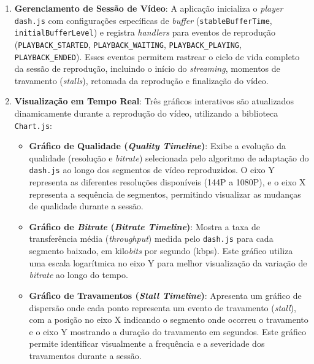 \begin{enumerate}
    \item \textbf{Gerenciamento de Sessão de Vídeo}: A aplicação inicializa o \textit{player} \texttt{dash.js} com configurações específicas de \textit{buffer} (\texttt{stableBufferTime}, \texttt{initialBufferLevel}) e registra \textit{handlers} para eventos de reprodução (\texttt{PLAYBACK\_STARTED}, \texttt{PLAYBACK\_WAITING}, \texttt{PLAYBACK\_PLAYING}, \texttt{PLAYBACK\_ENDED}). Esses eventos permitem rastrear o ciclo de vida completo da sessão de reprodução, incluindo o início do \textit{streaming}, momentos de travamento (\textit{stalls}), retomada da reprodução e finalização do vídeo.
    
    \item \textbf{Visualização em Tempo Real}: Três gráficos interativos são atualizados dinamicamente durante a reprodução do vídeo, utilizando a biblioteca \texttt{Chart.js}:
    \begin{itemize}
        \item \textbf{Gráfico de Qualidade (\textit{Quality Timeline})}: Exibe a evolução da qualidade (resolução e \textit{bitrate}) selecionada pelo algoritmo de adaptação do \texttt{dash.js} ao longo dos segmentos de vídeo reproduzidos. O eixo Y representa as diferentes resoluções disponíveis (144P a 1080P), e o eixo X representa a sequência de segmentos, permitindo visualizar as mudanças de qualidade durante a sessão.
        
        \item \textbf{Gráfico de \textit{Bitrate} (\textit{Bitrate Timeline})}: Mostra a taxa de transferência média (\textit{throughput}) medida pelo \texttt{dash.js} para cada segmento baixado, em kilo\textit{bits} por segundo (kbps). Este gráfico utiliza uma escala logarítmica no eixo Y para melhor visualização da variação de \textit{bitrate} ao longo do tempo.
        
        \item \textbf{Gráfico de Travamentos (\textit{Stall Timeline})}: Apresenta um gráfico de dispersão onde cada ponto representa um evento de travamento (\textit{stall}), com a posição no eixo X indicando o segmento onde ocorreu o travamento e o eixo Y mostrando a duração do travamento em segundos. Este gráfico permite identificar visualmente a frequência e a severidade dos travamentos durante a sessão.
    \end{itemize}
    

\end{enumerate}
